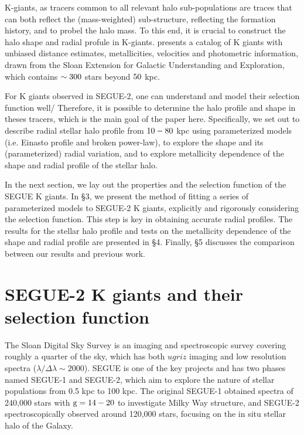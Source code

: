 \documentclass[12pt,preprint]{aastex}
\begin{document}
K-giants, as tracers common to all relevant halo sub-populations are traces that can both reflect the (mass-weighted) sub-structure, reflecting the formation history, and to probel the halo mass. To this end, it is crucial to construct the halo shape and radial profule in K-giants. \citet{Xue2014} presents a catalog of K giants with unbiased distance estimates, metallicities, velocities and photometric information, drawn from the Sloan Extension for Galactic Understanding and Exploration\citep[][SEGUE]{Yanny2009b}, which contains $\rm \sim 300$ stars beyond $\rm 50~$kpc. 

For K giants observed in SEGUE-2, one can understand and model their selection function well/ Therefore,  it is possible to determine the halo profile and shape in theses tracers, which is the main goal of the paper here. 
Specifically, we set out to describe radial stellar halo profile from $\rm 10-80~$kpc using parameterized models (i.e. Einasto profile and broken power-law), to explore the shape and its (parameterized) radial variation, and to explore metallicity dependence of the shape and radial profile of the stellar halo.   

In the next section, we lay out the properties and the selection function of the SEGUE K giants. In \S 3, we present the method of fitting a series of parameterized models to SEGUE-2 K giants, explicitly and rigorously considering the selection function. This step is key in obtaining accurate radial profiles. The results for the stellar halo profile and tests on the metallicity dependence of the shape and radial profile are presented in \S 4. Finally, \S 5 discusses the comparison between our results and previous work.


\section{SEGUE-2 K giants and their selection function}
The Sloan Digital Sky Survey\citep[SDSS;][]{York2000} is an imaging and spectroscopic survey covering roughly a quarter of the sky, which has both $ugriz$ imaging \citep{Fukugita1996, Gunn1998, Stoughton2002, Pier2003, Eisenstein2011} and low resolution spectra ($\lambda/\Delta \lambda \sim 2000$). SEGUE is one of
the key projects and has two phases named SEGUE-1 and SEGUE-2, which aim to explore the nature of stellar populations from 0.5 kpc to 100 kpc\citep[][and Rockosi et al. in prep.]{Yanny2009b}. The original SEGUE-1 obtained spectra of 240,000 stars with $\rm g=14-20$ to investigate Milky Way structure, and SEGUE-2 spectroscopically observed around 120,000 stars, focusing on the in situ stellar halo of the Galaxy.
\end{document}
